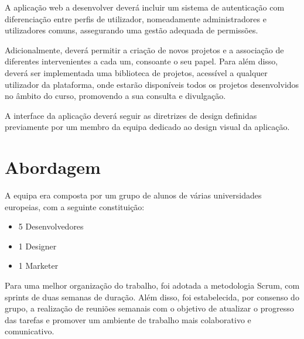 A aplicação web a desenvolver deverá incluir um sistema de autenticação com diferenciação entre perfis de utilizador, nomeadamente administradores e utilizadores comuns, assegurando uma gestão adequada de permissões. 

Adicionalmente, deverá permitir a criação de novos projetos e a associação de diferentes intervenientes a cada um, consoante o seu papel. Para além disso, deverá ser implementada uma biblioteca de projetos, acessível a qualquer utilizador da plataforma, onde estarão disponíveis todos os projetos desenvolvidos no âmbito do curso, promovendo a sua consulta e divulgação.

A interface da aplicação deverá seguir as diretrizes de design definidas previamente por um membro da equipa dedicado ao design visual da aplicação.



\section{Abordagem}

A equipa era composta por um grupo de alunos de várias universidades europeias, com a seguinte constituição:

\begin{itemize}
\item 5 Desenvolvedores
\item 1 Designer
\item 1 Marketer
\end{itemize}

Para uma melhor organização do trabalho, foi adotada a metodologia Scrum, com sprints de duas semanas de duração. Além disso, foi estabelecida, por consenso do grupo, a realização de reuniões semanais com o objetivo de atualizar o progresso das tarefas e promover um ambiente de trabalho mais colaborativo e comunicativo.